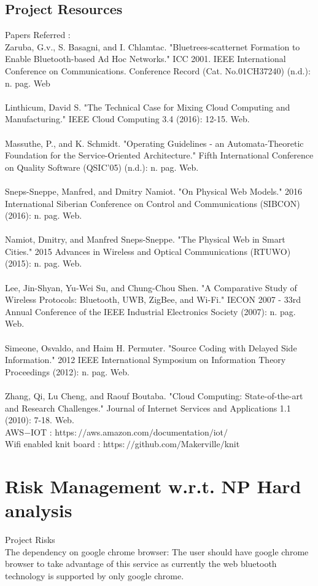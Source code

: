 \documentclass[oneside,a4paper,12pt]{report}
\begin{document}
\subsection{Project Resources}
Papers Referred :\\
Zaruba, G.v., S. Basagni, and I. Chlamtac. "Bluetrees-scatternet Formation to Enable Bluetooth-based Ad Hoc Networks." ICC 2001. IEEE International Conference on Communications. Conference Record (Cat. No.01CH37240) (n.d.): n. pag. Web\\ \\
Linthicum, David S. "The Technical Case for Mixing Cloud Computing and Manufacturing." IEEE Cloud Computing 3.4 (2016): 12-15. Web.\\ \\
Massuthe, P., and K. Schmidt. "Operating Guidelines - an Automata-Theoretic Foundation for the Service-Oriented Architecture." Fifth International Conference on Quality Software (QSIC'05) (n.d.): n. pag. Web.\\ \\
Sneps-Sneppe, Manfred, and Dmitry Namiot. "On Physical Web Models." 2016 International Siberian Conference on Control and Communications (SIBCON) (2016): n. pag. Web.\\ \\
Namiot, Dmitry, and Manfred Sneps-Sneppe. "The Physical Web in Smart Cities." 2015 Advances in Wireless and Optical Communications (RTUWO) (2015): n. pag. Web.\\ \\
Lee, Jin-Shyan, Yu-Wei Su, and Chung-Chou Shen. "A Comparative Study of Wireless Protocols: Bluetooth, UWB, ZigBee, and Wi-Fi." IECON 2007 - 33rd Annual Conference of the IEEE Industrial Electronics Society (2007): n. pag. Web.\\ \\
Simeone, Osvaldo, and Haim H. Permuter. "Source Coding with Delayed Side Information." 2012 IEEE International Symposium on Information Theory Proceedings (2012): n. pag. Web.\\ \\
Zhang, Qi, Lu Cheng, and Raouf Boutaba. "Cloud Computing: State-of-the-art and Research Challenges." Journal of Internet Services and Applications 1.1 (2010): 7-18. Web.\\
AWS$-$IOT : https$://$aws.amazon.com$/$documentation$/$iot$/$ \\
Wifi enabled knit board : https$://$github.com$/$Makerville$/$knit\\
\section{Risk Management w.r.t. NP Hard analysis}
Project Risks \\
The dependency on google chrome browser:
The user should have google chrome browser to take advantage of this service as currently the web bluetooth technology is supported by only google chrome.
\end{document}
